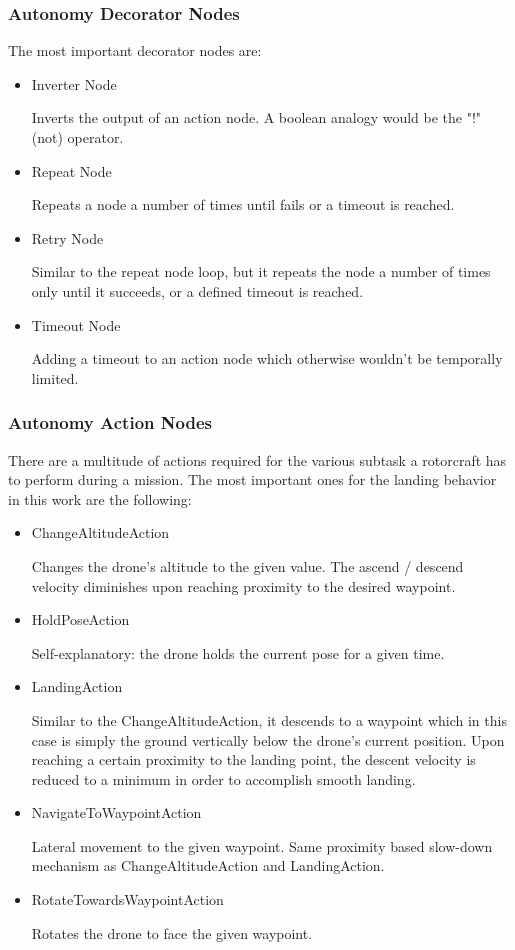 \subsubsection{Autonomy Decorator Nodes}\label{subsubsec:decorator_nodes}

The most important decorator nodes are:

\begin{itemize}
    \item Inverter Node
    
    Inverts the output of an action node. A boolean analogy would be the "!" (not) operator.
    \item Repeat Node
    
    Repeats a node a number of times until fails or a timeout is reached. 
    \item Retry Node
    
    Similar to the repeat node loop, but it repeats the node a number of times only until it succeeds, or a defined timeout is reached.
    \item Timeout Node
    
    Adding a timeout to an action node which otherwise wouldn't be temporally limited.
\end{itemize}

\subsubsection{Autonomy Action Nodes}\label{subsubsec:setup:action_nodes}

There are a multitude of actions required for the various subtask a rotorcraft has to perform during a mission. The most important ones for the landing behavior in this work are the following:

\begin{itemize}
    \item ChangeAltitudeAction
    
    Changes the drone's altitude to the given value. The ascend / descend velocity diminishes upon reaching proximity to the desired waypoint.
    \item HoldPoseAction
    
    Self-explanatory: the drone holds the current pose for a given time.
    \item LandingAction
    
    Similar to the ChangeAltitudeAction, it descends to a waypoint which in this case is simply the ground vertically below the drone's current position. Upon reaching a certain proximity to the landing point, the descent velocity is reduced to a minimum in order to accomplish smooth landing.
    \item NavigateToWaypointAction
    
    Lateral movement to the given waypoint. Same proximity based slow-down mechanism as ChangeAltitudeAction and LandingAction.
    \item RotateTowardsWaypointAction
    
    Rotates the drone to face the given waypoint.
\end{itemize}

